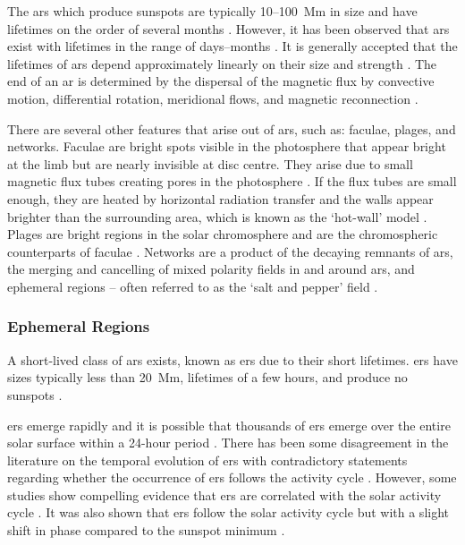 The \glspl{ar} which produce sunspots are typically 10--100~Mm in size and have lifetimes on the order of several months \citep{zwaan_solar_1981, schrijver_photospheric_1994, canfield_solar_2001, van_driel-gesztelyi_evolution_2015}. However, it has been observed that \glspl{ar} exist with lifetimes in the range of days--months \citep{schrijver_solar_2008}. It is generally accepted that the lifetimes of \glspl{ar} depend approximately linearly on their size and strength \citep{canfield_solar_2001, schrijver_solar_2008}. The end of an \gls{ar} is determined by the dispersal of the magnetic flux by convective motion, differential rotation, meridional flows, and magnetic reconnection \citep{canfield_solar_2001}.


There are several other features that arise out of \glspl{ar}, such as: faculae, plages, and networks. Faculae are bright spots visible in the photosphere that appear bright at the limb but are nearly invisible at disc centre. They arise due to small magnetic flux tubes creating pores in the photosphere \citep{solovev_structure_2019}. If the flux tubes are small enough, they are heated by horizontal radiation transfer and the walls appear brighter than the surrounding area, which is known as the `hot-wall' model \citep{spruit_pressure_1976, keller_origin_2004}. Plages are bright regions in the solar chromosphere and are the chromospheric counterparts of faculae \citep{pillet_active_1997}. Networks are a product of the decaying remnants of \glspl{ar}, the merging and cancelling of mixed polarity fields in and around \glspl{ar}, and ephemeral regions -- often referred to as the `salt and pepper' field \citep{martin_identification_1988}.


\glsresetall 
{}
\subsubsection*{Ephemeral Regions}

A short-lived class of \glspl{ar} exists, known as \glspl{er} due to their short lifetimes.  \glspl{er} have sizes typically less than 20~Mm, lifetimes of a few hours, and produce no sunspots \citep{harvey_solar_2001}.

\glspl{er} emerge rapidly and it is possible that thousands of \glspl{er} emerge over the entire solar surface within a 24-hour period \citep{harvey_solar_2001}. There has been some disagreement in the literature on the temporal evolution of \glspl{er} with contradictory statements regarding whether the occurrence of \glspl{er} follows the activity cycle \citep[see][]{harvey_properties_1993, hagenaar_ephemeral_2001, vieira_evolution_2010}. However, some studies show compelling evidence that \glspl{er} are correlated with the solar activity cycle \citep[see e.g.][and references therein]{vieira_evolution_2010,chaplin_sensitivity_2019}. It was also shown that \glspl{er} follow the solar activity cycle but with a slight shift in phase compared to the sunspot minimum \citep{harvey_ephemeral_1973, martin_ephemeral_1979}.


